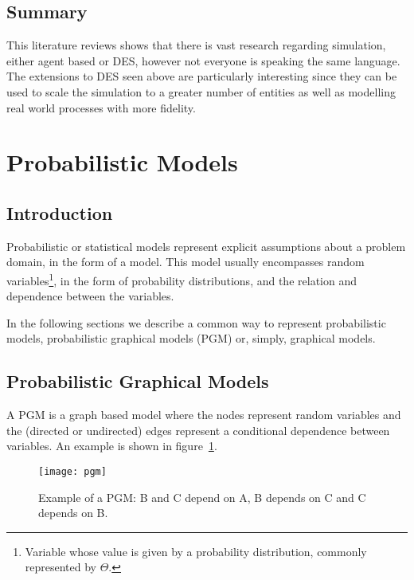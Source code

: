 \subsection{Summary}

This literature reviews shows that there is vast research regarding simulation, 
either agent based or DES, however not everyone is speaking the same language. 
The extensions to DES seen above are particularly interesting since they can be 
used to scale the simulation to a greater number of entities as well as 
modelling real world processes with more fidelity.

\section{Probabilistic Models} \label{sec:models}

\subsection{Introduction}

Probabilistic or statistical models represent explicit assumptions about a 
problem domain, in the form of a model. This model usually encompasses random 
variables\footnote{Variable whose value is given by a probability distribution, 
    commonly represented by $\Theta$.}, in the form of probability 
    distributions, 
and the relation and dependence between the variables.~\cite{Winn2013}

In the following sections we describe a common way to represent probabilistic 
models, probabilistic graphical models (PGM) or, simply, graphical models.

\subsection{Probabilistic Graphical Models}

A PGM is a graph based model where the nodes represent random variables and the 
(directed or undirected) edges represent a conditional dependence between 
variables. An example is shown in figure~\ref{fig:pgm}.

\begin{figure}[h]
    \begin{center}
        \leavevmode
        \texttt{[image: pgm]}
        \caption{Example of a PGM: B and C depend on A, B depends on C and C 
            depends on B.}
        \label{fig:pgm}
    \end{center}
\end{figure}

